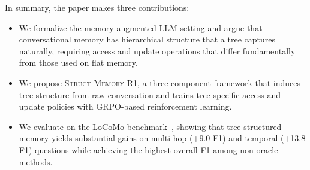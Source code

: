 In summary, the paper makes three contributions:
\begin{itemize}[nosep,leftmargin=1.5em]
\item We formalize the memory-augmented LLM setting and argue that conversational memory has hierarchical structure that a tree captures naturally, requiring access and update operations that differ fundamentally from those used on flat memory.
\item We propose \textsc{Struct Memory-R1}, a three-component framework that induces tree structure from raw conversation and trains tree-specific access and update policies with GRPO-based reinforcement learning.
\item We evaluate on the LoCoMo benchmark~, showing that tree-structured memory yields substantial gains on multi-hop (+9.0 F1) and temporal (+13.8 F1) questions while achieving the highest overall F1 among non-oracle methods.
\end{itemize}
